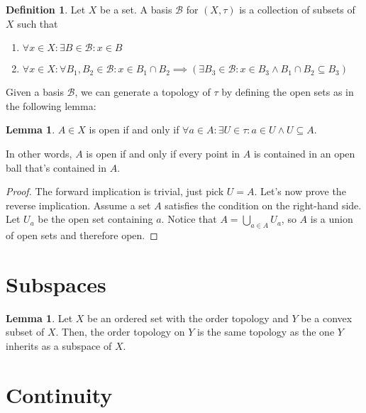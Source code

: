 \documentclass{article}
\theoremstyle{definition}
\newtheorem{definition}{Definition}
\newtheorem{lemma}[theorem]{Lemma}
\begin{document}
\begin{definition}
    Let $X$ be a set. A basis $\mathcal{B}$ for $(X,\tau)$ is a collection of subsets
    of $X$ such that

    \begin{enumerate}
        \item $\forall x \in X: \exists B \in \mathcal{B}: x \in B$
        \item $\forall x \in X: \forall B_{1},B_{2} \in \mathcal{B}: x \in B_{1} \cap B_{2} \implies
        (\exists B_{3} \in \mathcal{B}: x \in B_{3} \land B_{1} \cap B_{2} \subseteq B_{3})$
    \end{enumerate}
\end{definition}

Given a basis $\mathcal{B}$, we can generate a topology of $\tau$ by defining the open sets
as in the following lemma:

\begin{lemma}
    $A \in X$ is open if and only if $\forall a \in A: \exists U \in \tau: a \in U \land U \subseteq A$.

    In other words, $A$ is open if and only if every point in $A$ is contained in an open ball
    that's contained in $A$.
\end{lemma}
\begin{proof}
    The forward implication is trivial, just pick $U = A$. Let's now prove the reverse implication.
    Assume a set $A$ satisfies the condition on the right-hand side. Let $U_{a}$ be the open set
    containing $a$. Notice that $A = \bigcup_{a \in A} U_{a}$, so $A$ is a union of open sets and
    therefore open.
\end{proof}

\newpage

\section{Subspaces}

\begin{lemma}
    Let $X$ be an ordered set with the order topology and $Y$ be a convex subset of $X$.
    Then, the order topology on $Y$ is the same topology as the one $Y$ inherits as a subspace
    of $X$.
\end{lemma}




\newpage

\section{Continuity}
\end{document}
